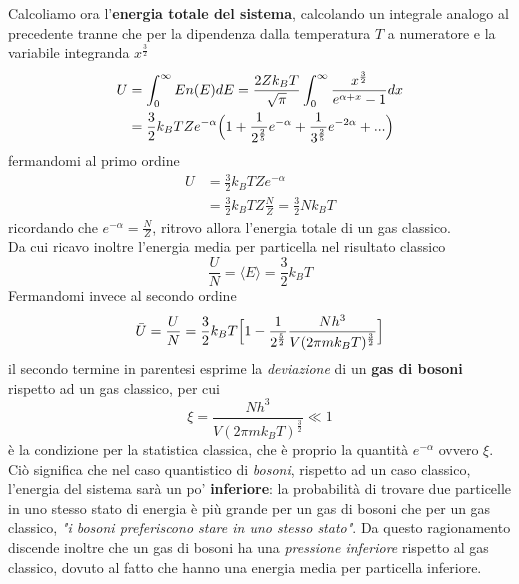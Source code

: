 Calcoliamo ora l'\textbf{energia totale del sistema}, calcolando un integrale analogo al precedente tranne che per la dipendenza dalla temperatura $T$ a numeratore e la variabile integranda $x^{ \frac{3}{2} }$ 
\begin{equation}
\begin{split}
U & = \int_0^{\infty} E n(E)dE = \frac{2Zk_B T}{\sqrt{\pi}} \int_0^{\infty} \frac{x^{ \frac{3}{2} }}{e^{ \alpha + x } - 1 } dx \\
& = \frac{3}{2} k_B T Z e^{ -\alpha } \Bigl(  1 + \frac{1}{2^{ \frac{2}{5} }} e^{ -\alpha } +  \frac{1}{3^{ \frac{2}{5} }} e^{ -2 \alpha } + ... \Bigr)
\end{split}
\end{equation}
fermandomi al primo ordine
\begin{equation}
\begin{split}
U & = \frac{3}{2} k_B T Z e^{ -\alpha } \\
& = \frac{3}{2} k_B T Z \frac{N}{Z} = \frac{3}{2} N k_B T
\end{split}
\end{equation}
ricordando che $e^{ -\alpha } = \frac{N}{Z}$, ritrovo allora l'energia totale di un gas classico. \\
Da cui ricavo inoltre l'energia media per particella nel risultato classico
\begin{equation}
\frac{U}{N} = \langle E \rangle = \frac{3}{2} k_B T
\end{equation}
Fermandomi invece al secondo ordine
\begin{equation}
\bar U = \frac{U}{N} = \frac{3}{2} k_B T \Bigl[  1 - \frac{1}{2^{ \frac{5}{2} }}  \frac{N h^3}{V (2\pi m k_B T)^{ \frac{3}{2} }}  \Bigr]
\end{equation}
il secondo termine in parentesi esprime la \textit{deviazione} di un \textbf{gas di bosoni} rispetto ad un gas classico, per cui
\begin{equation}
\xi = \frac{N h^3}{V (2\pi m k_B T)^{ \frac{3}{2} }}  \ll 1 
\end{equation}
è la condizione per la statistica classica, che è proprio la quantità $e^{-\alpha}$ ovvero $\xi$.
Ciò significa che nel caso quantistico di \textit{bosoni}, rispetto ad un caso classico, l'energia del sistema sarà un po' \textbf{inferiore}:
la probabilità di trovare due particelle in uno stesso stato di energia è più grande per un gas di bosoni che per un gas classico, \textit{"i bosoni preferiscono stare in uno stesso stato"}.
Da questo ragionamento discende inoltre che un gas di bosoni ha una \textit{pressione inferiore} rispetto al gas classico, dovuto al fatto che hanno una energia media per particella inferiore.

